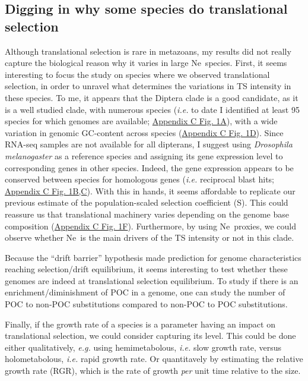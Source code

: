 \subsection{Digging in why some species do translational selection}

Although \gls{translational selection} is rare in metazoans, my results did not really capture the biological reason why it varies in large \acrshort{Ne}~species. First, it seems interesting to focus the study on species where we observed translational selection, in order to unravel what determines the variations in \acrshort{TS} intensity in these species. To me, it appears that the Diptera clade is a good candidate, as it is a well studied clade, with numerous species (\textit{i.e.} to date I identified at least 95 species for which genomes are available; \hyperref[suppfig:AppC1]{Appendix C Fig. 1A}), with a wide variation in genomic \gls{GC-content} across species (\hyperref[suppfig:AppC1]{Appendix C Fig. 1D}). Since \acrshort{RNA}-seq samples are not available for all dipterans, I suggest using \textit{Drosophila melanogaster} as a reference species and assigning its gene expression level to corresponding genes in other species. Indeed, the gene expression appears to be conserved between species for homologous genes (\textit{i.e.} reciprocal blast hits; \hyperref[suppfig:AppC1]{Appendix C Fig. 1B,C}). With this in hands, it seems affordable to replicate our previous estimate of the population-scaled selection coefficient (\acrshort{S}). This could reassure us that translational machinery varies depending on the genome base composition (\hyperref[suppfig:AppC1]{Appendix C Fig. 1F}). Furthermore, by using \acrshort{Ne}~proxies, we could observe whether \acrshort{Ne}~is the main drivers of the \acrshort{TS} intensity or not in this clade. 

Because the “drift barrier” hypothesis made prediction for genome characteristics reaching selection/drift equilibrium, it seems interesting to test whether these genomes are indeed at \gls{translational selection} equilibrium. To study if there is an enrichment/diminishment of \acrshort{POC} in a genome, one can study the number of \acrshort{POC} to non-\acrshort{POC} substitutions compared to non-\acrshort{POC} to \acrshort{POC} substitutions.

Finally, if the growth rate of a species is a parameter having an impact on \gls{translational selection}, we could consider capturing its level. This could be done either qualitatively, \textit{e.g.} using hemimetabolous, \textit{i.e.} slow growth rate, versus holometabolous, \textit{i.e.} rapid growth rate. Or quantitavely by estimating the relative growth rate (RGR), which is the rate of growth \textit{per} unit time relative to the size.


